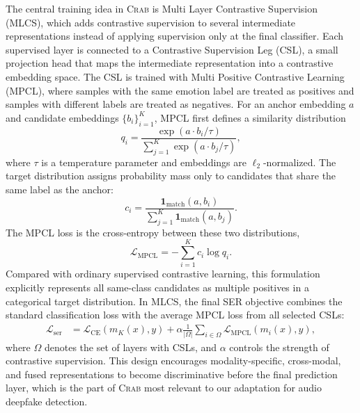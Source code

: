 \documentclass[12pt, a4paper, twocolumn]{article}
\newcommand{\crab}{\textsc{Crab}}
\begin{document}
The central training idea in \crab{} is Multi Layer Contrastive Supervision (MLCS), which adds contrastive supervision to several intermediate representations instead of applying supervision only at the final classifier.
Each supervised layer is connected to a Contrastive Supervision Leg (CSL), a small projection head that maps the intermediate representation into a contrastive embedding space.
The CSL is trained with Multi Positive Contrastive Learning (MPCL), where samples with the same emotion label are treated as positives and samples with different labels are treated as negatives.
For an anchor embedding \(a\) and candidate embeddings \(\{b_i\}_{i=1}^{K}\), MPCL first defines a similarity distribution
\begin{equation}
    \label{eq:mpcl_similarity}
    q_i =
    \frac{\exp(a \cdot b_i / \tau)}
    {\sum_{j=1}^{K}\exp(a \cdot b_j / \tau)},
\end{equation}
where \(\tau\) is a temperature parameter and embeddings are \(\ell_2\)-normalized.
The target distribution assigns probability mass only to candidates that share the same label as the anchor:
\begin{equation}
    \label{eq:mpcl_target}
    c_i =
    \frac{\mathbf{1}_{\mathrm{match}}(a,b_i)}
    {\sum_{j=1}^{K}\mathbf{1}_{\mathrm{match}}(a,b_j)}.
\end{equation}
The MPCL loss is the cross-entropy between these two distributions,
\begin{equation}
    \mathcal{L}_{\mathrm{MPCL}}
    = -\sum_{i=1}^{K} c_i \log q_i.
\end{equation}
Compared with ordinary supervised contrastive learning, this formulation explicitly represents all same-class candidates as multiple positives in a categorical target distribution.
In MLCS, the final SER objective combines the standard classification loss with the average MPCL loss from all selected CSLs:
\begin{equation}
    \begin{aligned}
    \mathcal{L}_{\mathrm{ser}}
    &=
    \mathcal{L}_{\mathrm{CE}}(m_K(x), y)
    +
    \alpha \frac{1}{|\Omega|}
    \sum_{i\in\Omega}
    \mathcal{L}_{\mathrm{MPCL}}(m_i(x), y),
    \end{aligned}
\end{equation}
where \(\Omega\) denotes the set of layers with CSLs, and \(\alpha\) controls the strength of contrastive supervision.
This design encourages modality-specific, cross-modal, and fused representations to become discriminative before the final prediction layer, which is the part of \crab{} most relevant to our adaptation for audio deepfake detection.
\end{document}
